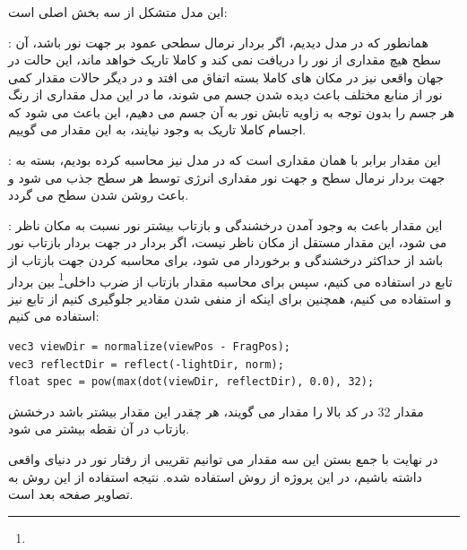 \documentclass[a4paper, 12pt]{report}
\newcommand{\lrbold}[1]{\lr{\textbf{#1}}}
\newcommand{\lrit}[1]{\lr{\textit{#1}}}
\begin{document}
    \subsubsection{}
        این مدل متشکل از سه بخش اصلی است:\par
    \lrbold{ambient}:
    همانطور که در مدل  دیدیم، اگر بردار نرمال سطحی عمود بر جهت نور باشد، آن سطح هیچ مقداری از نور را دریافت نمی کند و کاملا تاریک خواهد ماند، این حالت در جهان واقعی نیز در مکان های کاملا بسته اتفاق می افتد و در دیگر حالات مقدار کمی نور از منابع مختلف باعث دیده شدن جسم می شوند، ما در این مدل مقداری از رنگ هر جسم را بدون توجه به زاویه تابش نور به آن جسم می دهیم، این باعث می شود که اجسام کاملا تاریک به وجود نیایند، به این مقدار  می گوییم.\par

    \lrbold{diffuse}:
    این مقدار برابر با همان مقداری است که در مدل  نیز محاسبه کرده بودیم، بسته به جهت بردار نرمال سطح و جهت نور مقداری انرژی توسط هر سطح جذب می شود و باعث روشن شدن سطح می گردد.\par

    \lrbold{specular}:
    این مقدار باعث به وجود آمدن درخشندگی و بازتاب بیشتر نور نسبت به مکان ناظر می شود، این مقدار مستقل از مکان ناظر نیست، اگر بردار  در جهت بردار بازتاب نور باشد از حداکثر درخشندگی و  برخوردار می شود، برای محاسبه کردن جهت بازتاب از تابع  در  استفاده می کنیم، سپس برای محاسبه مقدار بازتاب از ضرب داخلی\footnote{} بین بردار  و  استفاده می کنیم، همچنین برای اینکه از منفی شدن مقادیر جلوگیری کنیم از تابع  نیز استفاده می کنیم:


    \begin{LTR}
    \small
        \begin{lstlisting}[style=C++Style,caption=\lrit{calculating specular component}]
vec3 viewDir = normalize(viewPos - FragPos);
vec3 reflectDir = reflect(-lightDir, norm);
float spec = pow(max(dot(viewDir, reflectDir), 0.0), 32);
        \end{lstlisting}
    \end{LTR}
    \normalsize
    \vspace*{0.3cm}

    مقدار 32 در کد بالا را مقدار  می گویند، هر چقدر این مقدار بیشتر باشد درخشش بازتاب در آن نقطه بیشتر می شود.\par
    در نهایت با جمع بستن این سه مقدار می توانیم تقریبی از رفتار نور در دنیای واقعی داشته باشیم، در این پروژه از روش  استفاده شده.
    نتیجه استفاده از این روش به تصاویر صفحه بعد است.
\end{document}
